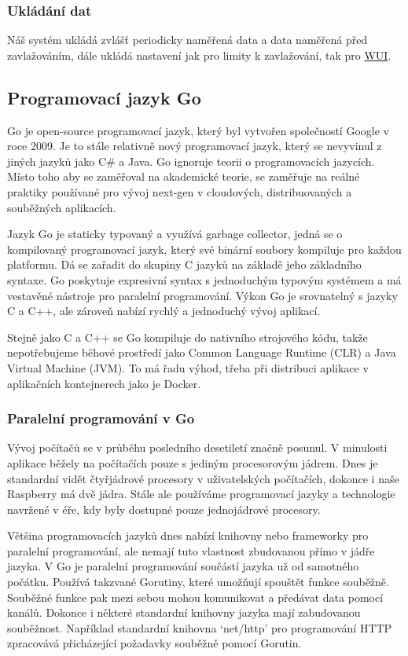 \documentclass[12pt,a4paper]{article}
\begin{document}
\subsubsection{Ukládání dat}

Náš systém ukládá zvlášť periodicky naměřená data a data naměřená před zavlažováním, dále ukládá nastavení jak pro limity k zavlažování, tak pro \underline{\ac{WUI}}.

\subsection{Programovací jazyk Go}

Go je open-source programovací jazyk, který byl vytvořen společností Google v roce 2009. Je to stále relativně nový programovací jazyk, který se nevyvinul z jiných jazyků jako C\# a Java. Go ignoruje teorii o programovacích jazycích. Místo toho aby se zaměřoval na akademické teorie, se zaměřuje na reálné praktiky používané pro vývoj next-gen v cloudových, distribuovaných a souběžných aplikacích.

Jazyk Go je staticky typovaný a využívá garbage collector, jedná se o kompilovaný programovací jazyk, který své binární soubory kompiluje pro každou platformu. Dá se zařadit do skupiny C jazyků na základě jeho základního syntaxe. Go poskytuje expresivní syntax s jednoduchým typovým systémem a má vestavěné nástroje pro paralelní programování. Výkon Go je srovnatelný s jazyky C a C++, ale zároveň nabízí rychlý a jednoduchý vývoj aplikací.

Stejně jako C a C++ se Go kompiluje do nativního strojového kódu, takže
nepotřebujeme běhové prostředí jako Common Language Runtime (CLR) a Java Virtual Machine (JVM). To má řadu výhod, třeba při distribuci aplikace v aplikačních kontejnerech jako je Docker.

\subsubsection{Paralelní programování v Go}

Vývoj počítačů se v průběhu posledního desetiletí značně posunul. V minulosti aplikace běžely na počítačích pouze s jediným procesorovým jádrem. Dnes je standardní vidět čtyřjádrové procesory v uživatelských počítačích, dokonce i naše Raspberry má dvě jádra. Stále ale používáme programovací jazyky a technologie navržené v éře, kdy byly dostupné pouze jednojádrové procesory.

Většina programovacích jazyků dnes nabízí knihovny nebo frameworky pro \linebreak paralelní programování, ale nemají tuto vlastnost zbudovanou přímo v jádře jazyka. V Go je paralelní programování součástí jazyka už od samotného počátku. Používá takzvané Gorutiny, které umožňují spouštět funkce souběžně. Souběžné funkce pak mezi sebou mohou komunikovat a předávat data pomocí kanálů. Dokonce i některé standardní knihovny jazyka mají zabudovanou souběžnost. Například standardní knihovna `net/http' pro programování HTTP zpracovává přicházející požadavky souběžně pomocí Gorutin.
\end{document}

